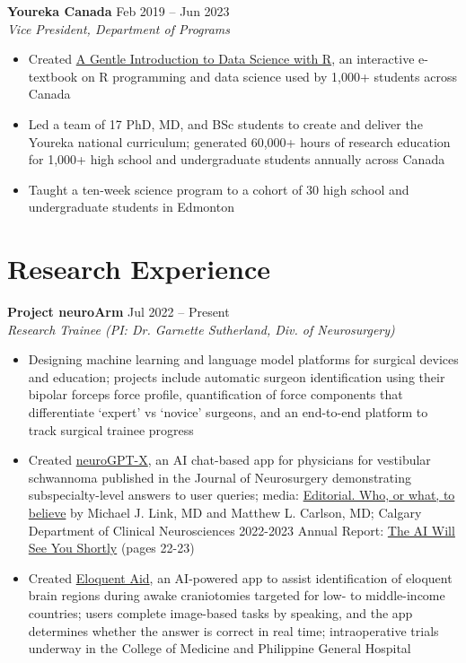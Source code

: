 \documentclass{article}
\begin{document}
\textbf{Youreka Canada} \hfill Feb 2019 -- Jun 2023 \\
\textit{Vice President, Department of Programs}
\begin{itemize}
    \item Created \href{https://youreka-textbook.netlify.app/}{A Gentle Introduction to Data Science with R}, an interactive e-textbook on R programming and data science used by 1,000+ students across Canada
    \item Led a team of 17 PhD, MD, and BSc students to create and deliver the Youreka national curriculum; generated 60,000+ hours of research education for 1,000+ high school and undergraduate students annually across Canada
    \item Taught a ten-week science program to a cohort of 30 high school and undergraduate students in Edmonton
\end{itemize}


\section*{\textcolor{my_colour}{Research Experience}}
\vspace{-.25em} \hrulefill \vspace{.25em}

\textbf{Project neuroArm} \hfill Jul 2022 -- Present\\
\textit{Research Trainee (PI: Dr. Garnette Sutherland, Div. of Neurosurgery)}
\begin{itemize}
    \item Designing machine learning and language model platforms for surgical devices and education; projects include automatic surgeon identification using their bipolar forceps force profile, quantification of force components that differentiate `expert' vs `novice' surgeons, and an end-to-end platform to track surgical trainee progress
    \item Created \href{https://doi.org/10.3171/2023.7.JNS23573}{neuroGPT-X}, an AI chat-based app for physicians for vestibular schwannoma published in the Journal of Neurosurgery demonstrating subspecialty-level answers to user queries; media: \href{https://doi.org/10.3171/2023.8.JNS231656}{Editorial. Who, or what, to believe} by Michael J. Link, MD and Matthew L. Carlson, MD; Calgary Department of Clinical Neurosciences 2022-2023 Annual Report: \href{https://cumming.ucalgary.ca/departments/dcns/about/annual-reports}{The AI Will See You Shortly} (pages 22-23)
    \item Created \href{https://www.eloquentaid.com/}{Eloquent Aid}, an AI-powered app to assist identification of eloquent brain regions during awake craniotomies targeted for low- to middle-income countries; users complete image-based tasks by speaking, and the app determines whether the answer is correct in real time; intraoperative trials underway in the College of Medicine and Philippine General Hospital
\end{itemize} \vspace{1em}
\end{document}
